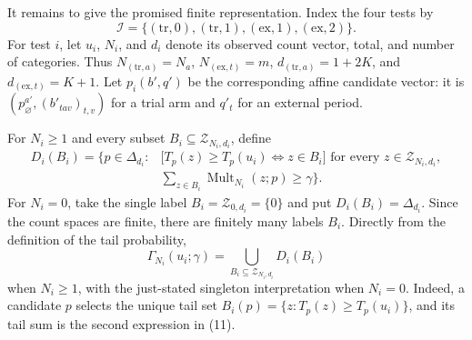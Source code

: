 It remains to give the promised finite representation. Index the four tests by
\[
 \mathcal I=\{(\mathrm{tr},0),(\mathrm{tr},1),(\mathrm{ex},1),(\mathrm{ex},2)\}.
\]
For test \(i\), let \(u_i\), \(N_i\), and \(d_i\) denote its observed count vector, total, and number of categories. Thus \(N_{(\mathrm{tr},a)}=N_a\), \(N_{(\mathrm{ex},t)}=m\), \(d_{(\mathrm{tr},a)}=1+2K\), and \(d_{(\mathrm{ex},t)}=K+1\). Let \(p_i(b',q')\) be the corresponding affine candidate vector: it is \((p^{a\prime}_{\varnothing},(b'_{tav})_{t,v})\) for a trial arm and \(q'_t\) for an external period.

For \(N_i\geq1\) and every subset \(B_i\subseteq\mathcal Z_{N_i,d_i}\), define
\[
 \begin{aligned}
 D_i(B_i)=\biggl\{p\in\Delta_{d_i}:{}&
 \bigl[T_p(z)\geq T_p(u_i)\iff z\in B_i\bigr]
       \text{ for every }z\in\mathcal Z_{N_i,d_i},\\
 &\sum_{z\in B_i}\operatorname{Mult}_{N_i}(z;p)\geq\gamma
 \biggr\}. \tag{11}
 \end{aligned}
\]
For \(N_i=0\), take the single label \(B_i=\mathcal Z_{0,d_i}=\{0\}\) and put \(D_i(B_i)=\Delta_{d_i}\). Since the count spaces are finite, there are finitely many labels \(B_i\). Directly from the definition of the tail probability,
\[
 \Gamma_{N_i}(u_i;\gamma)=\bigcup_{B_i\subseteq\mathcal Z_{N_i,d_i}}D_i(B_i) \tag{12}
\]
when \(N_i\geq1\), with the just-stated singleton interpretation when \(N_i=0\). Indeed, a candidate \(p\) selects the unique tail set \(B_i(p)=\{z:T_p(z)\geq T_p(u_i)\}\), and its tail sum is the second expression in (11).

